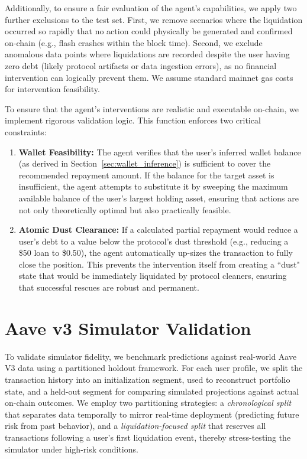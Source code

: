 \documentclass[manuscript,screen,review]{acmart}
\begin{document}
Additionally, to ensure a fair evaluation of the agent's capabilities, we apply two further exclusions to the test set. First, we remove scenarios where the liquidation occurred so rapidly that no action could physically be generated and confirmed on-chain (e.g., flash crashes within the block time). Second, we exclude anomalous data points where liquidations are recorded despite the user having zero debt (likely protocol artifacts or data ingestion errors), as no financial intervention can logically prevent them.
We assume standard mainnet gas costs for intervention feasibility.

To ensure that the agent's interventions are realistic and executable on-chain, we implement rigorous validation logic. This function enforces two critical constraints:
\begin{enumerate}
    \item \textbf{Wallet Feasibility:} The agent verifies that the user's inferred wallet balance (as derived in Section~\ref{sec:wallet_inference}) is sufficient to cover the recommended repayment amount. If the balance for the target asset is insufficient, the agent attempts to substitute it by sweeping the maximum available balance of the user's largest holding asset, ensuring that actions are not only theoretically optimal but also practically feasible.
    \item \textbf{Atomic Dust Clearance:} If a calculated partial repayment would reduce a user's debt to a value below the protocol's dust threshold (e.g., reducing a \$50 loan to \$0.50), the agent automatically up-sizes the transaction to fully close the position. This prevents the intervention itself from creating a ``dust" state that would be immediately liquidated by protocol cleaners, ensuring that successful rescues are robust and permanent.
\end{enumerate}

\section{Aave v3 Simulator Validation}
\label{sec:simulator}

To validate simulator fidelity, we benchmark predictions against real-world Aave V3 data using a partitioned holdout framework. For each user profile, we split the transaction history into an initialization segment, used to reconstruct portfolio state, and a held-out segment for comparing simulated projections against actual on-chain outcomes. We employ two partitioning strategies: a \emph{chronological split} that separates data temporally to mirror real-time deployment (predicting future risk from past behavior), and a \emph{liquidation-focused split} that reserves all transactions following a user's first liquidation event, thereby stress-testing the simulator under high-risk conditions.
\end{document}
